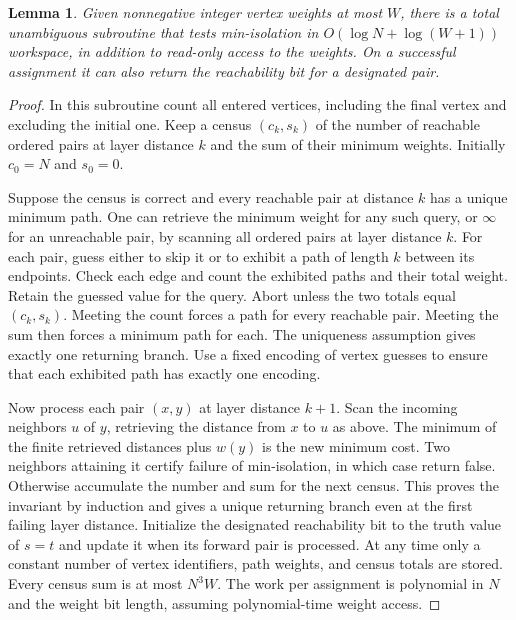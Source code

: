 \documentclass[11pt]{article}
\newtheorem{lemma}[theorem]{Lemma}
\begin{document}
\begin{lemma}\label{lem:check}
Given nonnegative integer vertex weights at most $W$, there is a total unambiguous subroutine that tests min-isolation in $O(\log N+\log(W+1))$ workspace, in addition to read-only access to the weights. On a successful assignment it can also return the reachability bit for a designated pair.
\end{lemma}
\begin{proof}
In this subroutine count all entered vertices, including the final vertex and excluding the initial one. Keep a census $(c_k,s_k)$ of the number of reachable ordered pairs at layer distance $k$ and the sum of their minimum weights. Initially $c_0=N$ and $s_0=0$.

Suppose the census is correct and every reachable pair at distance $k$ has a unique minimum path. One can retrieve the minimum weight for any such query, or $\infty$ for an unreachable pair, by scanning all ordered pairs at layer distance $k$. For each pair, guess either to skip it or to exhibit a path of length $k$ between its endpoints. Check each edge and count the exhibited paths and their total weight. Retain the guessed value for the query. Abort unless the two totals equal $(c_k,s_k)$. Meeting the count forces a path for every reachable pair. Meeting the sum then forces a minimum path for each. The uniqueness assumption gives exactly one returning branch. Use a fixed encoding of vertex guesses to ensure that each exhibited path has exactly one encoding.

Now process each pair $(x,y)$ at layer distance $k+1$. Scan the incoming neighbors $u$ of $y$, retrieving the distance from $x$ to $u$ as above. The minimum of the finite retrieved distances plus $w(y)$ is the new minimum cost. Two neighbors attaining it certify failure of min-isolation, in which case return false. Otherwise accumulate the number and sum for the next census. This proves the invariant by induction and gives a unique returning branch even at the first failing layer distance. Initialize the designated reachability bit to the truth value of $s=t$ and update it when its forward pair is processed. At any time only a constant number of vertex identifiers, path weights, and census totals are stored. Every census sum is at most $N^3 W$. The work per assignment is polynomial in $N$ and the weight bit length, assuming polynomial-time weight access.
\end{proof}
\end{document}
